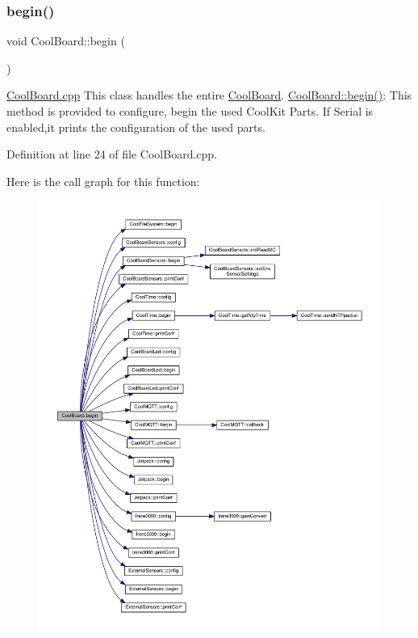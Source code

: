 \subsubsection{\texorpdfstring{begin()}{begin()}}
{\footnotesize\ttfamily void Cool\+Board\+::begin (\begin{DoxyParamCaption}{ }\end{DoxyParamCaption})}

\hyperlink{_cool_board_8cpp}{Cool\+Board.\+cpp} This class handles the entire \hyperlink{class_cool_board}{Cool\+Board}. \hyperlink{class_cool_board_acba7c5aef7268b2c0044bdb54d3b9d76}{Cool\+Board\+::begin()}\+: This method is provided to configure, begin the used Cool\+Kit Parts. If Serial is enabled,it prints the configuration of the used parts. 

Definition at line 24 of file Cool\+Board.\+cpp.

Here is the call graph for this function\+:\nopagebreak
\begin{figure}[H]
\begin{center}
\leavevmode
\includegraphics[width=350pt]{class_cool_board_acba7c5aef7268b2c0044bdb54d3b9d76_cgraph}
\end{center}
\end{figure}
\mbox{\label{class_cool_board_a583a874c09c07e70a6eb9229fc4beddb}} 
